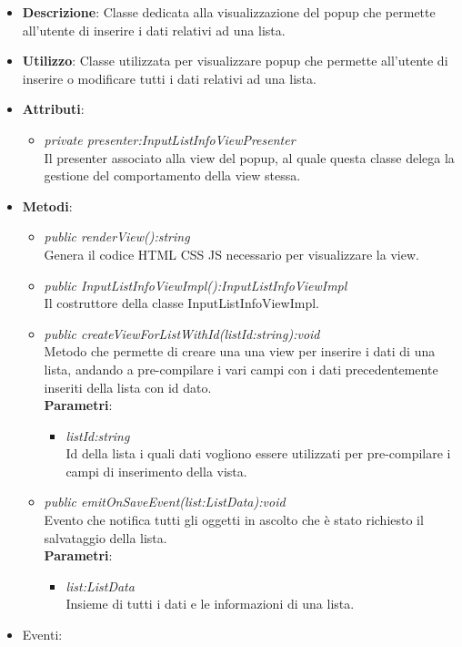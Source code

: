 \begin{itemize}
\item \textbf{Descrizione}: Classe dedicata alla visualizzazione del popup che permette all'utente di inserire i dati relativi ad una lista.
\item \textbf{Utilizzo}: Classe utilizzata per visualizzare popup che permette all'utente di inserire o modificare tutti i dati relativi ad una lista.
\item \textbf{Attributi}: 
	\begin{itemize}
	\item \textit{private presenter:InputListInfoViewPresenter}\\
		Il presenter associato alla view del popup, al quale questa classe delega la gestione del comportamento della view stessa.
	\end{itemize}
\item \textbf{Metodi}:
	\begin{itemize}	
	\item \textit{public renderView():string}\\
			Genera il codice HTML CSS JS necessario per visualizzare la view.
	\item \textit{public InputListInfoViewImpl():InputListInfoViewImpl}\\
	Il costruttore della classe InputListInfoViewImpl.
	\item \textit{public createViewForListWithId(listId:string):void}\\
		Metodo che permette di creare una una view per inserire i dati di una lista, andando a pre-compilare i vari campi con i dati precedentemente inseriti della lista con id dato.
			\\ \textbf{Parametri}: \begin{itemize}
			\item \textit{listId:string}\\
			Id della lista i quali dati vogliono essere utilizzati per pre-compilare i campi di inserimento della vista.
			\end{itemize} 
	\item \textit{public emitOnSaveEvent(list:ListData):void}\\
	Evento che notifica tutti gli oggetti in ascolto che è stato richiesto il salvataggio della lista.
			\\ \textbf{Parametri}: \begin{itemize}
			\item \textit{list:ListData}\\
				Insieme di tutti i dati e le informazioni di una lista.
			\end{itemize} 
	\end{itemize}
\item{Eventi}:
\end{itemize}

